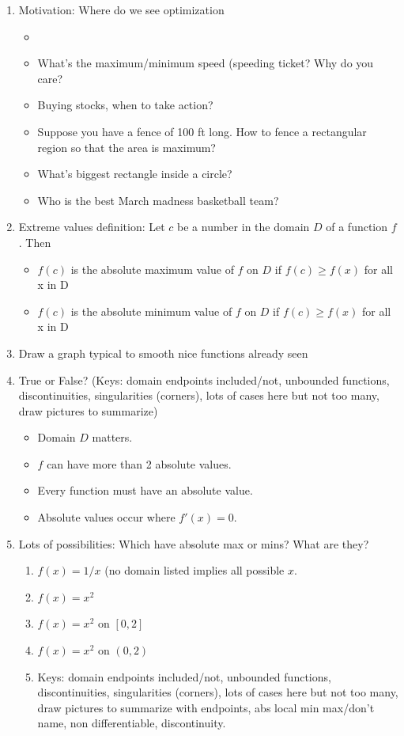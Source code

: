 \documentclass{article}
\begin{document}
\begin{enumerate}
\item Motivation: Where do we see optimization
\begin{itemize}
\item
\item What's the maximum/minimum speed (speeding ticket? Why do you care?
\item Buying stocks, when to take action?
\item Suppose you have a fence of 100 ft long. How to fence a rectangular region so that the area is maximum?
\item What's biggest rectangle inside a circle?
\item Who is the best March madness basketball team?
\end{itemize}

\item Extreme values definition: Let $c$ be a number in the domain $D$ of a function $f$. Then
\begin{itemize}
\item $f(c)$ is the absolute maximum value of $f$ on $D$ if $f(c)\geq f(x)$ for all x in D
\item $f(c)$ is the absolute minimum value of $f$ on $D$ if $f(c)\geq f(x)$ for all x in D
\end{itemize}
\item Draw a graph typical to smooth nice functions already seen

\item True or False? (Keys: domain endpoints included/not, unbounded functions, discontinuities, singularities (corners), lots of cases here but not too many, draw pictures to summarize)
\begin{itemize}
\item Domain $D$ matters. 
\item $f$ can have more than 2 absolute values.
\item Every function must have an absolute value.
\item Absolute values occur where $f'(x)=0$.
\end{itemize}

\item Lots of possibilities: Which have absolute max or mins? What are they?
\begin{enumerate}
\item $f(x)=1/x$ (no domain listed implies all possible $x$.
\item $f(x)=x^2$
\item $f(x)=x^2$ on $[0,2]$
\item $f(x)=x^2$ on $(0,2)$
\item Keys: domain endpoints included/not, unbounded functions, discontinuities, singularities (corners), lots of cases here but not too many, draw pictures to summarize with endpoints, abs local min max/don't name, non differentiable, discontinuity.
\end{enumerate}


\end{enumerate}
\end{document}
